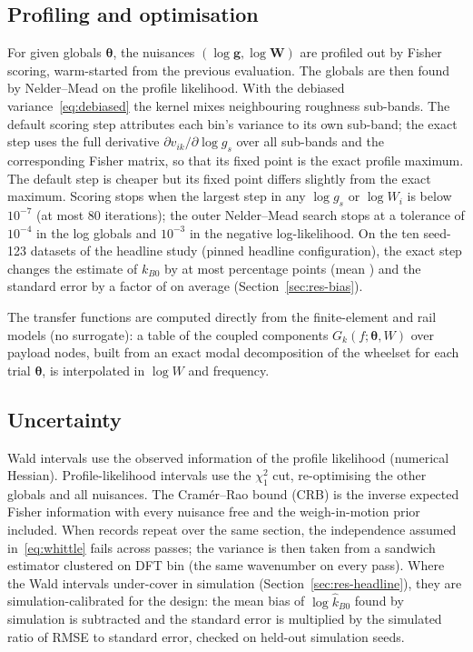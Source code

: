 \subsection{Profiling and optimisation}\label{sec:profile}
For given globals $\bm\theta$, the nuisances $(\log\bm g, \log\bm W)$ are profiled out by Fisher
scoring, warm-started from the previous evaluation. The globals are then found by Nelder--Mead on
the profile likelihood. With the debiased variance~\eqref{eq:debiased} the kernel mixes
neighbouring roughness sub-bands. The default scoring step attributes each bin's variance to its
own sub-band; the exact step uses the full derivative $\partial v_{ik}/\partial\log g_s$ over all
sub-bands and the corresponding Fisher matrix, so that its fixed point is the exact profile maximum.
The default step is cheaper but its fixed point differs slightly from the exact maximum. Scoring stops
when the largest step in any $\log g_s$ or $\log W_i$ is below $10^{-7}$ (at most 80 iterations); the
outer Nelder--Mead search stops at a tolerance of $10^{-4}$ in the log globals and $10^{-3}$ in the
negative log-likelihood. On the ten seed-123 datasets of the headline study (pinned headline configuration), the exact step changes the
estimate of $k_{B0}$ by at most \ScoreExactMaxDiff{} percentage points (mean \ScoreExactMeanDiff) and
the standard error by a factor of \ScoreExactSERatio{} on average (Section~\ref{sec:res-bias}).

The transfer functions are computed directly from the finite-element and rail models (no
surrogate): a table of the coupled components $G_k(f;\bm\theta,W)$ over payload nodes, built from an
exact modal decomposition of the wheelset for each trial $\bm\theta$, is interpolated in $\log W$
and frequency.

\subsection{Uncertainty}\label{sec:uncertainty}
Wald intervals use the observed information of the profile likelihood (numerical Hessian).
Profile-likelihood intervals use the $\chi^2_1$ cut, re-optimising the other globals and all
nuisances. The Cram\'er--Rao bound (CRB) is the inverse expected Fisher information with every
nuisance free and the weigh-in-motion prior included. When records repeat over the same section,
the independence assumed in~\eqref{eq:whittle} fails across passes; the variance is then taken
from a sandwich estimator clustered on DFT bin (the same wavenumber on every pass).
Where the Wald intervals under-cover in simulation (Section~\ref{sec:res-headline}), they are
simulation-calibrated for the design: the mean bias of $\log\hat k_{B0}$ found by simulation is
subtracted and the standard error is multiplied by the simulated ratio of RMSE to standard error,
checked on held-out simulation seeds.

